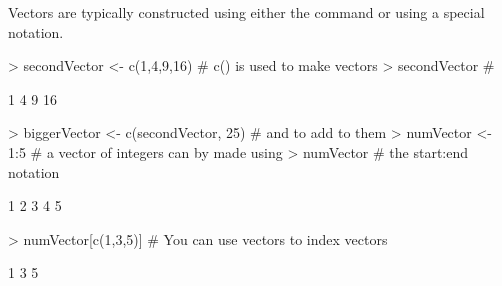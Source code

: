 \documentclass[10pt,letterpaper]{article}
\begin{document}
Vectors are typically constructed using either the  command or using a special  notation.
\begin{Schunk}
\begin{Sinput}
> secondVector <- c(1,4,9,16)         # c() is used to make vectors
> secondVector                        #
\end{Sinput}
\begin{Soutput}
[1]  1  4  9 16
\end{Soutput}
\begin{Sinput}
> biggerVector <- c(secondVector, 25) # and to add to them
> numVector <- 1:5                    # a vector of integers can by made using
> numVector                           #       the start:end notation
\end{Sinput}
\begin{Soutput}
[1] 1 2 3 4 5
\end{Soutput}
\begin{Sinput}
> numVector[c(1,3,5)]                 # You can use vectors to index vectors
\end{Sinput}
\begin{Soutput}
[1] 1 3 5
\end{Soutput}
\end{Schunk}
\end{document}

